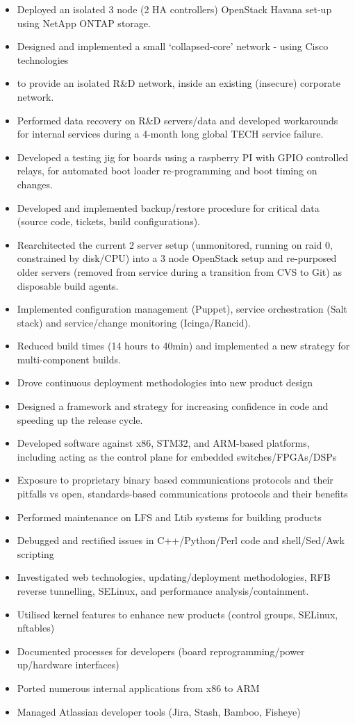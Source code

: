 \begin{itemize}
\tightlist
\item
  Deployed an isolated 3 node (2 HA controllers) OpenStack Havana set-up
  using NetApp ONTAP storage.
\item
  Designed and implemented a small `collapsed-core' network - using
  Cisco technologies
\item
  to provide an isolated R\&D network, inside an existing (insecure)
  corporate network.
\item
  Performed data recovery on R\&D servers/data and developed workarounds
  for internal services during a 4-month long global TECH service
  failure.
\item
  Developed a testing jig for boards using a raspberry PI with GPIO
  controlled relays, for automated boot loader re-programming and boot
  timing on changes.
\item
  Developed and implemented backup/restore procedure for critical data
  (source code, tickets, build configurations).
\item
  Rearchitected the current 2 server setup (unmonitored, running on raid
  0, constrained by disk/CPU) into a 3 node OpenStack setup and
  re-purposed older servers (removed from service during a transition
  from CVS to Git) as disposable build agents.
\item
  Implemented configuration management (Puppet), service orchestration
  (Salt stack) and service/change monitoring (Icinga/Rancid).
\item
  Reduced build times (14 hours to 40min) and implemented a new strategy
  for multi-component builds.
\item
  Drove continuous deployment methodologies into new product design
\item
  Designed a framework and strategy for increasing confidence in code
  and speeding up the release cycle.
\item
  Developed software against x86, STM32, and ARM-based platforms,
  including acting as the control plane for embedded switches/FPGAs/DSPs
\item
  Exposure to proprietary binary based communications protocols and
  their pitfalls vs open, standards-based communications protocols and
  their benefits
\item
  Performed maintenance on LFS and Ltib systems for building products
\item
  Debugged and rectified issues in C++/Python/Perl code and
  shell/Sed/Awk scripting
\item
  Investigated web technologies, updating/deployment methodologies, RFB
  reverse tunnelling, SELinux, and performance analysis/containment.
\item
  Utilised kernel features to enhance new products (control groups,
  SELinux, nftables)
\item
  Documented processes for developers (board reprogramming/power
  up/hardware interfaces)
\item
  Ported numerous internal applications from x86 to ARM
\item
  Managed Atlassian developer tools (Jira, Stash, Bamboo, Fisheye)
\end{itemize}

